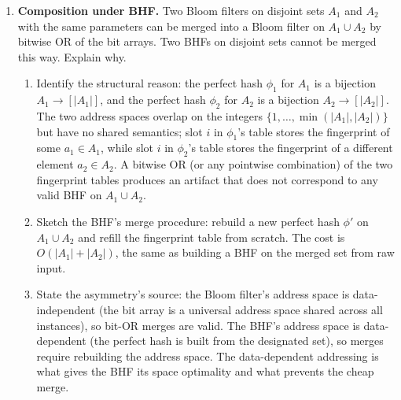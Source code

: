 \begin{enumerate}
\item \exstarstar
\label{ex:ch14-8}
\textbf{Composition under BHF.}
Two Bloom filters on disjoint sets $A_1$ and $A_2$ with the same
parameters can be merged into a Bloom filter on $A_1 \cup A_2$ by
bitwise OR of the bit arrays. Two BHFs on disjoint sets cannot be
merged this way. Explain why.
\begin{enumerate}
  \item[(a)] Identify the structural reason: the perfect hash
    $\phi_1$ for $A_1$ is a bijection $A_1 \to [|A_1|]$, and the
    perfect hash $\phi_2$ for $A_2$ is a bijection $A_2 \to
    [|A_2|]$. The two address spaces overlap on the integers
    $\{1, \ldots, \min(|A_1|, |A_2|)\}$ but have no shared
    semantics; slot $i$ in $\phi_1$'s table stores the fingerprint
    of some $a_1 \in A_1$, while slot $i$ in $\phi_2$'s table
    stores the fingerprint of a different element $a_2 \in A_2$.
    A bitwise OR (or any pointwise combination) of the two
    fingerprint tables produces an artifact that does not
    correspond to any valid BHF on $A_1 \cup A_2$.
  \item[(b)] Sketch the BHF's merge procedure: rebuild a new
    perfect hash $\phi'$ on $A_1 \cup A_2$ and refill the
    fingerprint table from scratch. The cost is $O(|A_1| +
    |A_2|)$, the same as building a BHF on the merged set from
    raw input.
  \item[(c)] State the asymmetry's source: the Bloom filter's
    address space is data-independent (the bit array is a
    universal address space shared across all instances), so bit-OR
    merges are valid. The BHF's address space is data-dependent
    (the perfect hash is built from the designated set), so merges
    require rebuilding the address space. The data-dependent
    addressing is what gives the BHF its space optimality and what
    prevents the cheap merge.
\end{enumerate}



\end{enumerate}
